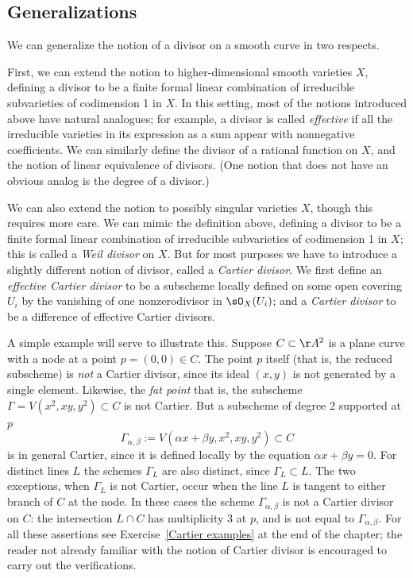 \subsection*{Generalizations}

We can generalize the notion of a divisor on a smooth curve in two respects.

First, we can extend the notion to higher-dimensional smooth varieties
$X$, defining a divisor to be a finite formal linear combination of
irreducible subvarieties of codimension 1 in $X$. In this setting,
most of the notions introduced above have natural analogues; for
%
example, a divisor is called \emph{effective} if all the irreducible
varieties in its expression as a sum appear with nonnegative
coefficients. We can similarly define the divisor of a rational
function on $X$, and the notion of linear equivalence of divisors.
(One notion that does not have an obvious analog is the degree of a divisor.)

We can also extend the notion to possibly singular varieties $X$,
though this requires more care. We can mimic the definition above,
defining a divisor to be a finite formal linear combination of
irreducible subvarieties of codimension 1 in $X$; this is called a
%
\emph{Weil divisor} on $X$. But for most purposes we have to introduce
a slightly different notion of divisor, called a \emph{Cartier
  divisor}. We first define an \emph{effective Cartier divisor} to be
%
a subscheme locally defined on some open covering $U_{i}$ by the
vanishing of one nonzerodivisor in $\sO_{X}(U_{i})$; and a
\emph{Cartier divisor} to be a difference of effective Cartier divisors.

A simple example will serve to illustrate this. Suppose $C \subset
\AA^2$ is a plane curve with a node at a point $p = (0,0) \in C$. The
point $p$ itself (that is, the reduced subscheme) is \emph{not} a
Cartier divisor, since its ideal $(x,y)$ is not generated by a single
element. Likewise, the
\emph{fat point}
%
\emdash that is, the subscheme $\Gamma = V(x^2, xy, y^2) \subset C$
\emdash is not Cartier. But a subscheme of degree 2 supported at $p$
$$
\Gamma_{\alpha, \beta} := V(\alpha x + \beta y, x^2, xy, y^2) \subset C
$$ 
\emdash 
is in general Cartier, 
since
it is defined locally by the equation $\alpha x + \beta y = 0$. 
For distinct lines $L$ the schemes $\Gamma_{L}$ are also distinct,
since $\Gamma_{L}\subset L$. The two exceptions, when $\Gamma_{L}$ is
not Cartier, occur when the line $L$ is tangent to either branch of
$C$ at the node. 
In these cases the scheme $\Gamma_{\alpha, \beta}$ is not a Cartier
divisor on $C$: the intersection $L \cap C$ has multiplicity 3 at $p$,
and is not equal to $\Gamma_{\alpha, \beta}$. 
For all these assertions see
Exercise~\ref{Cartier examples} 
at the end of the chapter; 
the reader
not already familiar with the notion of Cartier divisor is
encouraged to carry out the verifications. 

